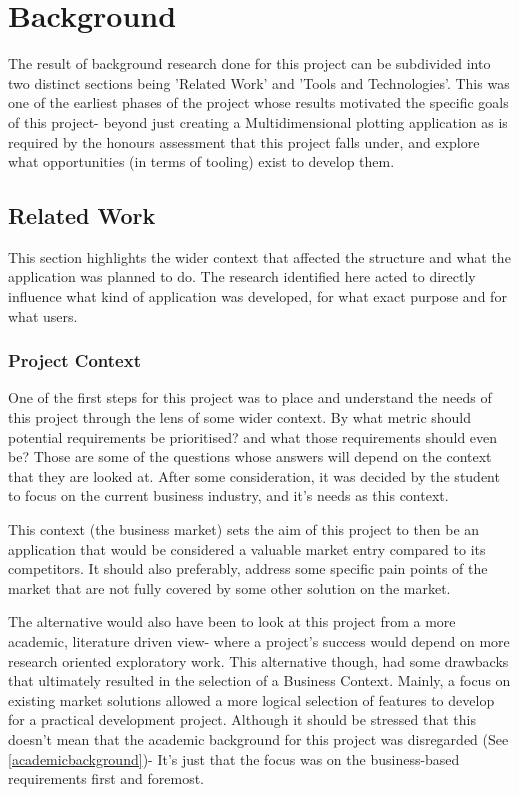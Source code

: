 \section{Background}

The result of background research done for this project can be subdivided into two distinct sections being 'Related Work' and 'Tools and Technologies'. This was one of the earliest phases of the project whose results motivated the specific goals of this project- beyond just creating a Multidimensional plotting application as is required by the honours assessment that this project falls under, and explore what opportunities (in terms of tooling) exist to develop them.

\subsection{Related Work}
This section highlights the wider context that affected the structure and what the application was planned to do. The research identified here acted to directly influence what kind of application was developed, for what exact purpose and for what users.

\subsubsection{Project Context}
One of the first steps for this project was to place and understand the needs of this project through the lens of some wider context. By what metric should potential requirements be prioritised? and what those requirements should even be? Those are some of the questions whose answers will depend on the context that they are looked at. After some consideration, it was decided by the student to focus on the current business industry, and it’s needs as this context.

\begin{displayquote}
    This context (the business market) sets the aim of this project to then be an application that would be considered a valuable market entry compared to its competitors. It should also preferably, address some specific pain points of the market that are not fully covered by some other solution on the market.
\end{displayquote}

The alternative would also have been to look at this project from a more academic, literature driven view- where a project’s success would depend on more research oriented exploratory work. This alternative though, had some drawbacks that ultimately resulted in the selection of a Business Context. Mainly, a focus on existing market solutions allowed a more logical selection of features to develop for a practical development project. Although it should be stressed that this doesn’t mean that the academic background for this project was disregarded (See \ref{academicbackground})- It’s just that the focus was on the business-based requirements first and foremost.

